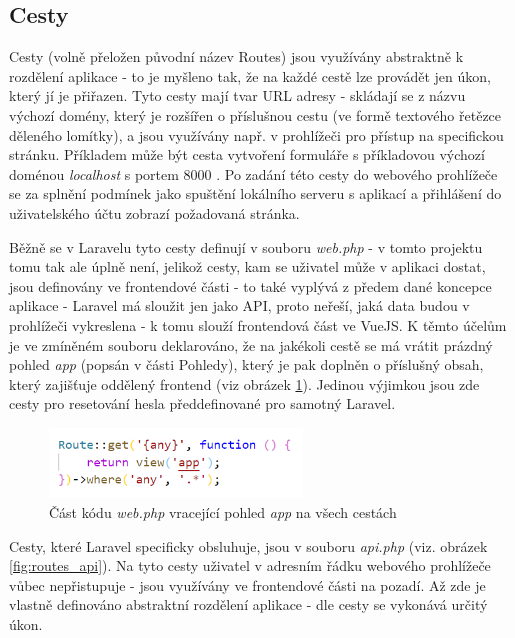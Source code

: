 	\subsection{Cesty} %
	Cesty (volně přeložen původní název Routes) jsou využívány abstraktně k rozdělení aplikace - to je myšleno tak, že na každé cestě lze provádět jen úkon, který jí je přiřazen. Tyto cesty mají tvar URL adresy - skládají se z názvu výchozí domény, který je rozšířen o příslušnou cestu (ve formě textového řetězce děleného lomítky), a jsou využívány např. v prohlížeči pro přístup na specifickou stránku. Příkladem může být cesta vytvoření formuláře s příkladovou výchozí doménou \textit{localhost} s portem 8000 \textit{}. Po zadání této cesty do webového prohlížeče se za splnění podmínek jako spuštění lokálního serveru s aplikací a přihlášení do uživatelského účtu zobrazí požadovaná stránka.
	
	Běžně se v Laravelu tyto cesty definují v souboru \textit{web.php} - v tomto projektu tomu tak ale úplně není, jelikož cesty, kam se uživatel může v aplikaci dostat, jsou definovány ve frontendové části - to také vyplývá z předem dané koncepce aplikace - Laravel má sloužit jen jako API, proto neřeší, jaká data budou v prohlížeči vykreslena - k tomu slouží frontendová část ve VueJS. K těmto účelům je ve zmíněném souboru deklarováno, že na jakékoli cestě se má vrátit prázdný pohled \textit{app} (popsán v části Pohledy), který je pak doplněn o příslušný obsah, který zajišťuje oddělený frontend (viz obrázek \ref{fig:routes_web}). Jedinou výjimkou jsou zde cesty pro resetování hesla předdefinované pro samotný Laravel.
	
	\begin{figure}[H]
		\centering %
		\includegraphics[width=0.6\textwidth]{img/routes/web_routes.png} %
		\caption{Část kódu \textit{web.php} vracející pohled \textit{app} na všech cestách} %
		\label{fig:routes_web} %
	\end{figure}
	
	Cesty, které Laravel specificky obsluhuje, jsou v souboru \textit{api.php} (viz. obrázek \ref{fig:routes_api}). Na tyto cesty uživatel v adresním řádku webového prohlížeče vůbec nepřistupuje - jsou využívány ve frontendové části na pozadí. Až zde je vlastně definováno abstraktní rozdělení aplikace - dle cesty se vykonává určitý úkon. 
	
